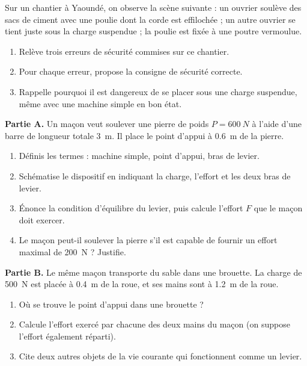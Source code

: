 \documentclass[11pt]{article}
\newcounter{popsec}
\newcounter{popsub}
\newcommand{\courssub}[1]{%
  \stepcounter{popsub}%
  \par\vspace{9pt}\noindent{\popxbold\fontsize{11.5}{13}\selectfont\color{popink}{\color{poporange}\thepopsec.\thepopsub}\hspace{6pt}#1}\par\nopagebreak\vspace{4pt}
}
\begin{document}
\begin{exercice}
Sur un chantier à Yaoundé, on observe la scène suivante : un ouvrier soulève des sacs de ciment avec une poulie dont la corde est effilochée ; un autre ouvrier se tient juste sous la charge suspendue ; la poulie est fixée à une poutre vermoulue.
\begin{enumerate}
\item Relève trois erreurs de sécurité commises sur ce chantier.
\item Pour chaque erreur, propose la consigne de sécurité correcte.
\item Rappelle pourquoi il est dangereux de se placer sous une charge suspendue, même avec une machine simple en bon état.
\end{enumerate}
\end{exercice}

\courssub{Je me prépare au Bac}

\begin{exercice}
\textbf{Partie A.} Un maçon veut soulever une pierre de poids $P = \SI{600}{N}$ à l'aide d'une barre de longueur totale \SI{3}{m}. Il place le point d'appui à \SI{0,6}{m} de la pierre.
\begin{enumerate}
\item Définis les termes : machine simple, point d'appui, bras de levier.
\item Schématise le dispositif en indiquant la charge, l'effort et les deux bras de levier.
\item Énonce la condition d'équilibre du levier, puis calcule l'effort $F$ que le maçon doit exercer.
\item Le maçon peut-il soulever la pierre s'il est capable de fournir un effort maximal de \SI{200}{N} ? Justifie.
\end{enumerate}
\textbf{Partie B.} Le même maçon transporte du sable dans une brouette. La charge de \SI{500}{N} est placée à \SI{0,4}{m} de la roue, et ses mains sont à \SI{1,2}{m} de la roue.
\begin{enumerate}
\item Où se trouve le point d'appui dans une brouette ?
\item Calcule l'effort exercé par chacune des deux mains du maçon (on suppose l'effort également réparti).
\item Cite deux autres objets de la vie courante qui fonctionnent comme un levier.
\end{enumerate}
\end{exercice}
\end{document}
